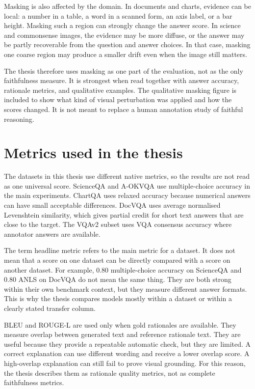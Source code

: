 Masking is also affected by the domain.
In documents and charts, evidence can be local: a number in a table, a word in a scanned form, an axis label, or a bar height.
Masking such a region can strongly change the answer score.
In science and commonsense images, the evidence may be more diffuse, or the answer may be partly recoverable from the question and answer choices.
In that case, masking one coarse region may produce a smaller drift even when the image still matters.

The thesis therefore uses masking as one part of the evaluation, not as the only faithfulness measure.
It is strongest when read together with answer accuracy, rationale metrics, and qualitative examples.
The qualitative masking figure is included to show what kind of visual perturbation was applied and how the scores changed.
It is not meant to replace a human annotation study of faithful reasoning.

\section{Metrics used in the thesis}
The datasets in this thesis use different native metrics, so the results are not read as one universal score.
ScienceQA and A-OKVQA use multiple-choice accuracy in the main experiments.
ChartQA uses relaxed accuracy because numerical answers can have small acceptable differences.
DocVQA uses average normalised Levenshtein similarity, which gives partial credit for short text answers that are close to the target.
The VQAv2 subset uses VQA consensus accuracy where annotator answers are available.

The term headline metric refers to the main metric for a dataset.
It does not mean that a score on one dataset can be directly compared with a score on another dataset.
For example, 0.80 multiple-choice accuracy on ScienceQA and 0.80 ANLS on DocVQA do not mean the same thing.
They are both strong within their own benchmark context, but they measure different answer formats.
This is why the thesis compares models mostly within a dataset or within a clearly stated transfer column.

BLEU and ROUGE-L are used only when gold rationales are available.
They measure overlap between generated text and reference rationale text.
They are useful because they provide a repeatable automatic check, but they are limited.
A correct explanation can use different wording and receive a lower overlap score.
A high-overlap explanation can still fail to prove visual grounding.
For this reason, the thesis describes them as rationale quality metrics, not as complete faithfulness metrics.

